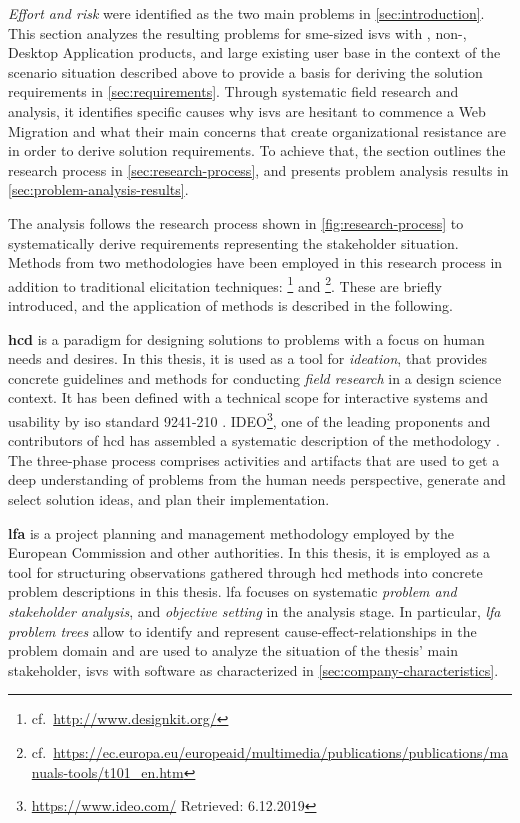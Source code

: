 \emph{Effort and risk} were identified as the two main problems in \cref{sec:introduction}.
This section analyzes the resulting problems for \gls{sme}-sized \glspl{isv} with , non-, \gls{Desktop Application} products, and large existing user base in the context of the scenario situation described above to provide a basis for deriving the solution requirements in \cref{sec:requirements}.
Through systematic field research and analysis, it identifies specific causes why \glspl{isv} are hesitant to commence a \gls{Web Migration} and what their main concerns that create organizational resistance are in order to derive solution requirements.%
To achieve that, the section outlines the research process in \cref{sec:research-process}, and presents problem analysis results in \cref{sec:problem-analysis-results}.

The analysis follows the research process shown in \cref{fig:research-process} to systematically derive requirements representing the stakeholder situation.
Methods from two methodologies have been employed in this research process in addition to traditional elicitation techniques:  \footnote{cf.~\url{http://www.designkit.org/}} and \footnote{cf.~\url{https://ec.europa.eu/europeaid/multimedia/publications/publications/manuals-tools/t101\_en.htm}}.
These are briefly introduced, and the application of methods is described in the following.

\textbf{\gls{hcd}} is a paradigm for designing solutions to problems with a focus on human needs and desires.
In this thesis, it is used as a tool for \emph{ideation}, that provides concrete guidelines and methods for conducting \emph{field research} in a design science context.
It has been defined with a technical scope for interactive systems and usability by \gls{iso} standard 9241-210 \autocite{ISO9241-210HCD}.
IDEO\footnote{\url{https://www.ideo.com/} Retrieved: 6.12.2019}, one of the leading proponents and contributors of \gls{hcd} has assembled a systematic description of the methodology \autocite{HCD2015}.
The three-phase process comprises activities and artifacts that are used to get a deep understanding of problems from the human needs perspective, generate and select solution ideas, and plan their implementation.

\textbf{\gls{lfa}} is a project planning and management methodology employed by the European Commission \autocite{Commission2004PCM} and other authorities.
In this thesis, it is employed as a tool for structuring observations gathered through \gls{hcd} methods into concrete problem descriptions in this thesis.
\gls{lfa} focuses on systematic \emph{problem and stakeholder analysis}, and \emph{objective setting} in the analysis stage.
In particular, \emph{\gls{lfa} problem trees} allow to identify and represent cause-effect-relationships in the problem domain and are used to analyze the situation of the thesis' main stakeholder, \glspl{isv} with  software as characterized in \cref{sec:company-characteristics}.

